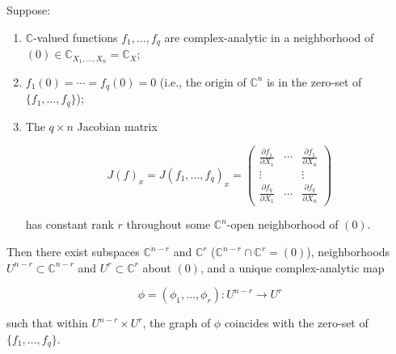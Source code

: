 Suppose:

\begin{enumerate}
\item $\mathbb{C}$-valued functions $f_1, \ldots, f_q$ are complex-analytic in a neighborhood of $(0) \in \mathbb{C}_{X_1, \ldots, X_n} = \mathbb{C}_X$;
\item $f_1(0) = \cdots = f_q(0) = 0$ (i.e., the origin of $\mathbb{C}^n$ is in the zero-set of $\{f_1, \ldots, f_q\}$);
\item The $q \times n$ Jacobian matrix

$$J(f)_x = J(f_1, \ldots, f_q)_x = \begin{pmatrix}
\frac{\partial f_1}{\partial X_1} & \cdots & \frac{\partial f_1}{\partial X_n} \\
\vdots & & \vdots \\
\frac{\partial f_q}{\partial X_1} & \cdots & \frac{\partial f_q}{\partial X_n}
\end{pmatrix}$$

has constant rank $r$ throughout some $\mathbb{C}^n$-open neighborhood of $(0)$.
\end{enumerate}

Then there exist subspaces $\mathbb{C}^{n-r}$ and $\mathbb{C}^r$ ($\mathbb{C}^{n-r} \cap \mathbb{C}^r = (0)$), neighborhoods $U^{n-r} \subset \mathbb{C}^{n-r}$ and $U^r \subset \mathbb{C}^r$ about $(0)$, and a unique complex-analytic map

$$\phi = (\phi_1, \ldots, \phi_r): U^{n-r} \to U^r$$

such that within $U^{n-r} \times U^r$, the graph of $\phi$ coincides with the zero-set of $\{f_1, \ldots, f_q\}$.

